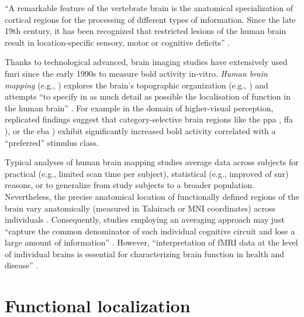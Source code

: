 
%
``A remarkable feature of the vertebrate brain is the anatomical specialization
of cortical regions for the processing of different types of information. Since
the late 19th century, it has been recognized that restricted lesions of the
human brain result in location-specific sensory, motor or cognitive deficits''
\citep{cohen1994localization}.


%
Thanks to technological advanced, brain imaging studies have extensively used
\ac{fmri} since the early 1990s to measure \ac{bold} activity in-vitro.
%
\textit{Human brain mapping} (e.g., \citep{raichle2009brief}) explores the
brain's topographic organization (e.g., \citep{eickhoff2018topographic}) and
attempts ``to specify in as much detail as possible the localisation of function
in the human brain'' \citep{savoy2001history}.
For example in the domain of higher-visual perception, replicated findings
suggest that category-selective brain regions like the \ac{ppa}
\citep{epstein1998ppa}, \ac{ffa} \citep{kanwisher1997ffa}), or the \ac{eba}
\citep{downing2001bodyarea}) exhibit significantly increased \ac{bold} activity
correlated with a ``preferred'' stimulus class.

%
Typical analyses of human brain mapping studies average data across subjects for
practical (e.g., limited scan time per subject), statistical (e.g., improved
of \ac{snr}) reasons, or to generalize from study subjects to a broader
population.
%
Nevertheless, the precise anatomical location of functionally defined regions of
the brain vary anatomically (measured in Talairach or MNI coordinates) across
individuals \citep{friston2006critique, saxe2006divide}.
%
Consequently, studies employing an averaging approach may just ``capture the
common denominator of each individual cognitive circuit and lose a large amount
of information'' \citep{pinel2007fast}.
%
However, ``interpretation of fMRI data at the level of individual brains is
essential for characterizing brain function in health and disease''
\citep{dubois2016building}.


\section{Functional localization}

